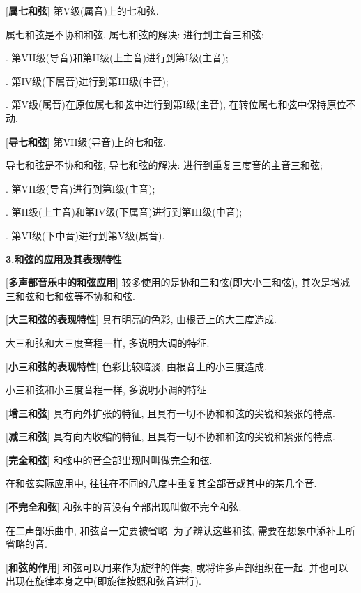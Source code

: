 [\textbf{属七和弦}] 第V级(属音)上的七和弦.\par
\qquad 属七和弦是不协和和弦, 属七和弦的解决: 进行到主音三和弦;\par
\qquad {}. 第VII级(导音)和第II级(上主音)进行到第I级(主音);\par
\qquad {}. 第IV级(下属音)进行到第III级(中音);\par
\qquad {}. 第V级(属音)在原位属七和弦中进行到第I级(主音), 在转位属七和弦中保持原位不动.\par

\clearpage

[\textbf{导七和弦}] 第VII级(导音)上的七和弦.\par
\qquad 导七和弦是不协和和弦, 导七和弦的解决: 进行到重复三度音的主音三和弦;\par
\qquad {}. 第VII级(导音)进行到第I级(主音);\par
\qquad {}. 第II级(上主音)和第IV级(下属音)进行到第III级(中音);\par
\qquad {}. 第VI级(下中音)进行到第V级(属音).\par

\begin{center}
 \textbf{3.和弦的应用及其表现特性}\\
\end{center}

[\textbf{多声部音乐中的和弦应用}] 较多使用的是协和三和弦(即大小三和弦), 其次是增减三和弦和七和弦等不协和和弦.\par

[\textbf{大三和弦的表现特性}] 具有明亮的色彩, 由根音上的大三度造成.\par
\qquad 大三和弦和大三度音程一样, 多说明大调的特征.\par

[\textbf{小三和弦的表现特性}] 色彩比较暗淡, 由根音上的小三度造成.\par
\qquad 小三和弦和小三度音程一样, 多说明小调的特征.\par

[\textbf{增三和弦}] 具有向外扩张的特征, 且具有一切不协和和弦的尖锐和紧张的特点.\par

[\textbf{减三和弦}] 具有向内收缩的特征, 且具有一切不协和和弦的尖锐和紧张的特点.\par

[\textbf{完全和弦}] 和弦中的音全部出现时叫做完全和弦.\par
\qquad 在和弦实际应用中, 往往在不同的八度中重复其全部音或其中的某几个音.\par

[\textbf{不完全和弦}] 和弦中的音没有全部出现叫做不完全和弦.\par
\qquad 在二声部乐曲中, 和弦音一定要被省略. 为了辨认这些和弦, 需要在想象中添补上所省略的音.\par

[\textbf{和弦的作用}] 和弦可以用来作为旋律的伴奏, 或将许多声部组织在一起, 并也可以出现在旋律本身之中(即旋律按照和弦音进行).\par



